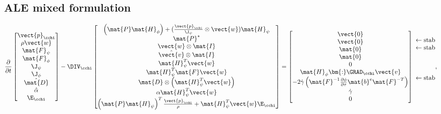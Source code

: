 \subsection{ALE mixed formulation}
\begin{equation}
	\frac{\partial}{\partial t}
	\begin{bmatrix}
		\vect{p}_{\cchi} \\
		\rho\vect{w} \\
		\mat{F}_{\psi} \\
		\mat{F}_{\phi} \\
		\J_{\psi} \\
		\J_{\phi} \\
		\hat{\mat{D}} \\
		\hat{\alpha} \\
		\E_{\cchi}
	\end{bmatrix}
	-
	\DIV_{\cchi}
	\begin{bmatrix}
		\left(\mat{P}\mat{H}_{\phi}\right) + (\frac{\vect{p}_{\cchi}}{\J_{\psi}}\otimes\vect{w})\mat{H}_{\psi} \\
		\mat{P}^\star \\
		\vect{w}\otimes\mat{I} \\
		\hat{\vect{v}}\otimes\mat{I} \\
		\mat{H}_{\psi}^T\vect{w} \\
		\mat{H}_{\psi}^T\mat{F}\vect{w} \\
		\mat{D} \otimes\left(\mat{H}_{\psi}^T\vect{w}\right) \\
		\alpha\mat{H}_{\psi}^T\vect{w} \\
		\left( \mat{P}\mat{H}_{\psi} \right)^T \frac{\vect{p}_{\cchi}}{\rho} + \mat{H}_{\psi}^T \vect{w}\E_{\cchi}
	\end{bmatrix}
    =
    \begin{bmatrix}
    	\vect{0} \\
    	\vect{0} \\
    	\mat{0} \\
    	\mat{0} \\
    	0 \\
    	\mat{H}_{\phi} \bm{:} \GRAD_{\cchi}\vect{v} \\
    	-2\dot{\gamma} \left( \mat{F}^{-1}\frac{\partial \phi}{\partial \tau}\mat{b}^e\mat{F}^{-T} \right) \\
    	\dot{\gamma} \\
    	0
    \end{bmatrix}
	~
	\begin{matrix}
		\leftarrow \text{stab}\\
		\leftarrow \text{stab}\\
		\\
		\\
		\\
		\leftarrow \text{stab}\\
		\\
		\\
		
	\end{matrix}
,
\end{equation}

